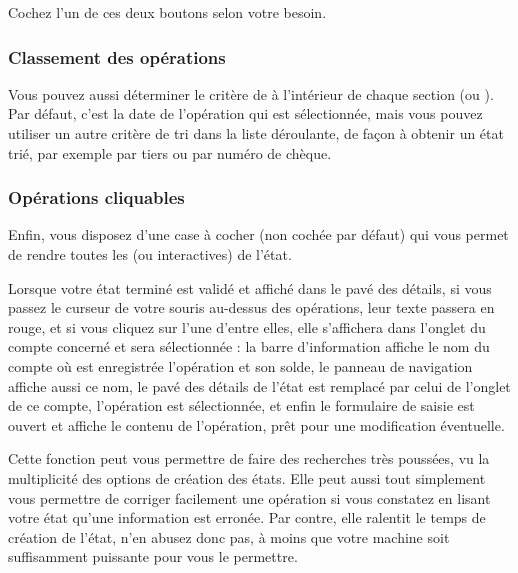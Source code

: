 Cochez l'un de ces deux boutons selon votre besoin.

\ifIllustration
\newpage
\fi


\subsubsection{Classement des opérations}

Vous pouvez aussi déterminer le critère de  à l'intérieur de chaque section (ou  ). Par défaut, c'est la date de l'opération qui est sélectionnée, mais vous pouvez utiliser un autre critère de \gls{tri} dans la liste déroulante, de façon à obtenir un état trié, par exemple par tiers ou par numéro de chèque.


\subsubsection{Opérations cliquables\label{reportscreation-display-transactions-clickable}}

Enfin, vous disposez d'une case à cocher (non cochée par défaut) qui vous permet
de rendre toutes les  (ou interactives) de l'état.

Lorsque votre état terminé est validé et affiché dans le pavé des détails, si vous passez le curseur de votre souris au-dessus des opérations, leur texte passera en rouge{\couleur}, et si vous cliquez sur l'une d'entre elles, elle s'affichera dans l'onglet  du compte concerné et sera sélectionnée : la barre d'information affiche le nom du compte où est enregistrée l'opération et son solde, le panneau de navigation affiche aussi ce nom, le pavé des détails de l'état est remplacé par celui de l'onglet  de ce compte, l'opération est sélectionnée, et enfin le formulaire de saisie est ouvert et affiche le contenu de l'opération, prêt pour une modification éventuelle.

Cette fonction peut vous permettre de faire des recherches très poussées, vu la multiplicité des options de création des états. Elle peut aussi tout simplement vous permettre de corriger facilement une opération si vous constatez en lisant votre état qu'une information est erronée. Par contre, elle ralentit le temps de création de l'état, n'en abusez donc pas, à moins que votre machine soit suffisamment puissante pour vous le permettre.

